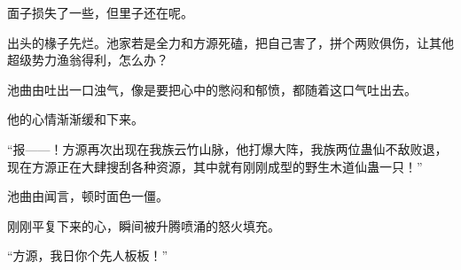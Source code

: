 \begin{this_body}
面子损失了一些，但里子还在呢。

出头的椽子先烂。池家若是全力和方源死磕，把自己害了，拼个两败俱伤，让其他超级势力渔翁得利，怎么办？

池曲由吐出一口浊气，像是要把心中的憋闷和郁愤，都随着这口气吐出去。

他的心情渐渐缓和下来。

“报——！方源再次出现在我族云竹山脉，他打爆大阵，我族两位蛊仙不敌败退，现在方源正在大肆搜刮各种资源，其中就有刚刚成型的野生木道仙蛊一只！”

池曲由闻言，顿时面色一僵。

刚刚平复下来的心，瞬间被升腾喷涌的怒火填充。

“方源，我日你个先人板板！”

\end{this_body}

